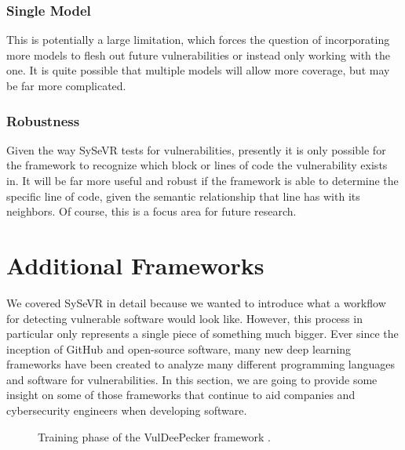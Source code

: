 \documentclass[12pt,twocolumn,letterpaper]{article}
\begin{document}
\subsubsection{Single Model}
This is potentially a large limitation, which forces the question of incorporating more models to flesh out future
vulnerabilities or instead only working with the one. It is quite possible that multiple models will allow more coverage, but
may be far more complicated.
\subsubsection{Robustness}
Given the way SySeVR tests for vulnerabilities, presently it is only possible for the framework to recognize which
block or lines of code the vulnerability exists in. It will be far more useful and robust if the framework is able to
determine the specific line of code, given the semantic relationship that line has with its neighbors. Of course, this is
a focus area for future research.

\section{Additional Frameworks}
\label{sec:additional-frameworks}
    

We covered SySeVR in detail because we wanted to introduce what a workflow for detecting vulnerable 
software would look like. However, this process in particular only represents a single piece of something 
much bigger. Ever since the inception of GitHub and open-source software, many new deep learning frameworks have been 
created to analyze many different programming languages and software for vulnerabilities. In this section, 
we are going to provide some insight on some of those frameworks that continue to aid companies and cybersecurity engineers 
when developing software.

\begin{figure}[h!]
    \centering
    \caption{Training phase of the VulDeePecker framework \cite{Zou21}.}
    \label{fig:af-0}
\end{figure}
\end{document}
